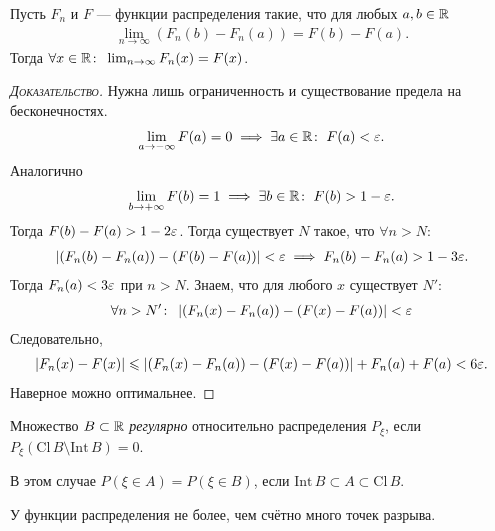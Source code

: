 \documentclass[../main.tex]{subfiles}
\begin{document}
\begin{remrk}
 Пусть $ F_n $ и $ F $ --- функции распределения такие, что для любых $ a, b \in \mathbb{R} $
 \begin{align*}
  \lim_{n \to \infty} (F_n(b) - F_n(a)) = F(b)  - F(a).
 \end{align*} Тогда $ \forall x \in \mathbb{R} \colon\; \lim_{n \to \infty}  F_n(x) = F(x)$.
\end{remrk}
\begin{proof}[\normalfont\textsc{Доказательство}]
 Нужна лишь ограниченность и существование предела на бесконечностях.
 \begin{align*}
  \lim_{a \to -\infty}  F(a) = 0 \implies \exists a \in \mathbb{R} \colon\;  F(a) < \varepsilon.
 \end{align*} Аналогично
 \begin{align*}
  \lim_{b \to +\infty} F(b) = 1 \implies \exists b \in \mathbb{R} \colon\; F(b) > 1 - \varepsilon. 
 \end{align*} Тогда $ F(b) - F(a) > 1 -2\varepsilon $. Тогда существует $ N $ такое, что $ \forall n > N \colon\;  $
 \begin{align*}
  \left|(F_n(b) - F_n(a)) - (F(b)-F(a)) \right| < \varepsilon \implies F_n(b) - F_n(a) > 1 - 3\varepsilon. 
 \end{align*} Тогда $ F_n(a) < 3\varepsilon $ при $ n > N $. Знаем, что для любого $ x $ существует $ N' $:
 \begin{align*}
  \forall n > N' \colon\; \left|(F_n(x) - F_n(a)) - (F(x)-F(a)) \right| < \varepsilon
 \end{align*} Следовательно,
 \begin{align*}
  \left|F_n(x) - F(x) \right| \leqslant \left| (F_n(x) - F_n(a)) - (F(x) - F(a)) \right| + F_n(a) + F(a) < 6\varepsilon.
 \end{align*} Наверное можно оптимальнее.
\end{proof}

\begin{df}
 Множество $ B \subset \mathbb{R} $ \textit{регулярно} относительно распределения $ P_\xi $, если $ P_\xi(\mathrm{Cl}\,B \setminus \mathrm{Int}\,B) = 0 $.
\end{df}

В этом случае $ P(\xi \in A) = P(\xi \in B) $, если $ \mathrm{Int}\,B \subset A \subset \mathrm{Cl}\,B $.

\begin{prop*}
 У функции распределения не более, чем счётно много точек разрыва.
\end{prop*}
\end{document}
